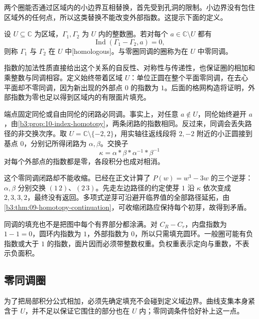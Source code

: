 两个圈能否通过区域内的小边界互相替换，首先受到孔洞的限制。小边界没有包住区域外的任何点，所以这类替换不能改变外部指数。这提示下面的定义。

\begin{definition}\label{b3:def:10-planar-homology}
设 \(U\subseteq\mathbb C\) 为区域，\(\Gamma_1,\Gamma_2\) 为 \(U\) 内的整数圈。若对每个 \(a\in\mathbb C\setminus U\) 都有
\[
 \operatorname{Ind}(\Gamma_1-\Gamma_2,a)=0,
\]
则称 \(\Gamma_1\) 与 \(\Gamma_2\) 在 \(U\) 中[homologous]。与零圈同调的圈称为在 \(U\) 中零同调。
\end{definition}

指数的加法性质直接给出这个关系的自反性、对称性与传递性，也保证圈的相加和乘整数与同调相容。定义始终带着区域 \(U\)：单位正圆在整个平面零同调，在去心平面却不零同调，因为新出现的外部点 \(0\) 的指数为 \(1\)。后面的格网构造将证明，外部指数为零也足以得到区域内的有限面片填充。

\ProseParagraphBreak
端点固定同伦或自由同伦的闭路必同调。事实上，对任意 \(a\notin U\)，同伦始终避开 \(a\)，由\cref{b3:prop:10-index-homotopy}，两条闭路的指数相同。反过来，同调会丢失路径的非交换次序。取 \(U=\mathbb C\setminus\{-2,2\}\)，用实轴往返线段将 \(2,-2\) 附近的小正圆接到基点 \(0\)，分别记所得闭路为 \(\alpha,\beta\)。交换子
\[
 \kappa=\alpha*\beta*\alpha^{-1}*\beta^{-1}
\]
对每个外部点的指数都是零，各段积分也成对相消。

\ProseParagraphBreak
这个零同调闭路却不能收缩。已经在正文计算了 \(P(w)=w^3-3w\) 的三个逆芽：\(\alpha,\beta\) 分别交换 \((1\,2)\)、\((2\,3)\)。先走左边路径的约定使芽 \(1\) 沿 \(\kappa\) 依次变成 \(2,3,3,2\)，最终没有返回。多项式逆芽可沿避开临界值的全部路径延拓，由\cref{b3:thm:09-homotopy-continuation}，可收缩闭路应保持每个初芽，故得到矛盾。

\ProseParagraphBreak
同调的填充也不是把图中每个有界部分都涂满。对 \(C_R-C_r\)，内盘指数为 \(1-1=0\)，圆环内指数为 \(1\)，外部指数为 \(0\)，所以只需填充圆环。一般圈可能有负指数或大于 \(1\) 的指数，面片因而必须带整数权重。负权重表示定向与重数，不表示负面积。

\subsection{零同调圈}
\label{b3:subsec:100303}

为了把局部积分公式相加，必须先确定填充不会碰到定义域边界。曲线支集本身紧含于 \(U\)，并不足以保证它围住的部分也在 \(U\) 内；零同调条件恰好补上这一点。

